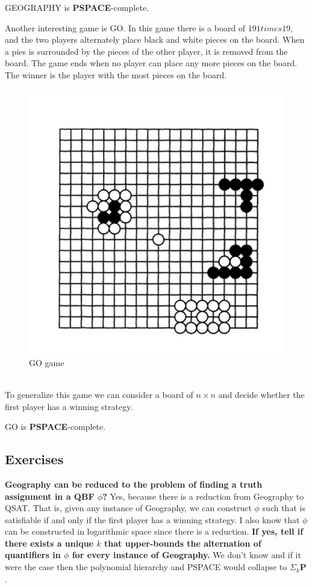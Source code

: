 \begin{defbox}[Theorem]
    GEOGRAPHY is \textbf{PSPACE}-complete.
\end{defbox} 
Another interesting game is GO. In this game there is a board of $191times 19$, and the two players alternately place black and white pieces on the board. When a pies is surrounded by the pieces of the other player, it is removed from the board. The game ends when no player can place any more pieces on the board. The winner is the player with the most pieces on the board. 
\begin{figure}[h]
    \centering
    \includegraphics[width=1\textwidth]{img/go.png}
    \caption{GO game}
\end{figure}
\\
To generalize this game we can consider a board of $n\times n$ and decide whether the first player has a winning strategy.
\begin{defbox}[Theorem]
    GO is \textbf{PSPACE}-complete.
\end{defbox}
\subsection{Exercises}
\textbf{Geography can be reduced to the problem of finding a truth assignment in a QBF $\phi$?} Yes, because there is a reduction from Geography to QSAT. That is, given any instance of Geography, we can construct $\phi$ such that is satisfiable if and only if the first player has a winning strategy. I also know that $\phi$ can be constructed in logarithmic space since there is a reduction.
\textbf{If yes, tell if there exists a unique $k$ that upper-bounds the alternation of quantifiers in $\phi$ for every instance of Geography.} We don't know and if it were the case then the polynomial hierarchy and PSPACE would collapse to $\Sigma_k\mathbf{P}$.

